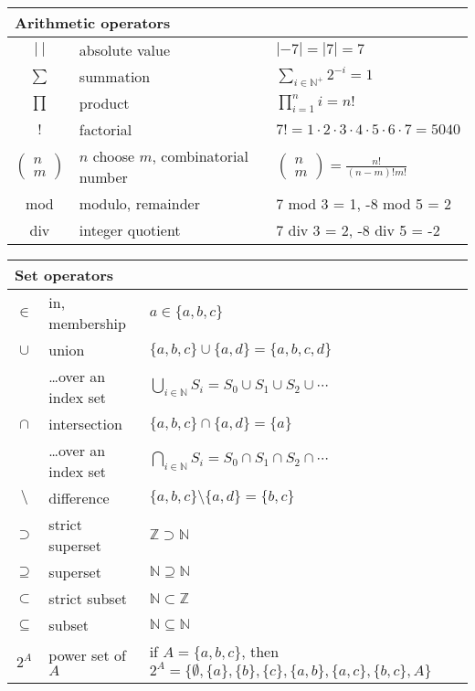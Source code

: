 \documentclass[11pt]{article}
\newcommand{\Naturals}{\mathbb{N}}   %
\newcommand{\Integers}{\mathbb{Z}}   %
\begin{document}
\begin{tabular}{|cll|}
\multicolumn{3}{l}{\bf Arithmetic operators}
\\ \hline
$|~|$ & absolute value & $| -7 | = |7| = 7$
\\ \hline
$\sum$ & summation& $\sum_{i \in \Naturals^+} 2^{-i} = 1$
\\ \hline
$\prod$ & product & $\prod_{i=1}^n i = n!$
\\ \hline
$!$ & factorial & $7! = 1\cdot 2\cdot 3\cdot 4\cdot 5\cdot 6\cdot 7 = 5040$
\\ \hline
$\left( \begin{array}{c} n\\m\end{array} \right )$ &
   $n$ choose $m$, combinatorial number &  $\left( \begin{array}{c}
    n\\m\end{array} \right ) = \displaystyle \frac{n!}{(n-m)! m!}$
\\ \hline
mod & modulo, remainder & 7 mod 3 = 1, -8 mod 5 = 2
\\ \hline
div & integer quotient & 7 div 3 = 2, -8 div 5 = -2
\\ \hline
\end{tabular}

\begin{tabular}{|cll|}
\multicolumn{3}{l}{\bf Set operators}
\\ \hline
$\in$ & in, membership & $a \in \{a,b,c\}$
\\ \hline
$\cup$ & union & $\{a,b,c\} \cup \{a,d\} = \{a,b,c,d\}$
\\ \hline
       & \ldots over an index set & $\bigcup_{i\in \Naturals}
                S_i = S_0 \cup S_1 \cup S_2 \cup \cdots$
\\ \hline
$\cap$ & intersection & $\{a,b,c\} \cap \{a,d\} = \{a\}$
\\ \hline
       & \ldots over an index set & $\bigcap_{i\in \Naturals}
                S_i = S_0 \cap S_1 \cap S_2 \cap \cdots$
\\ \hline
$\setminus$ & difference & $\{a,b,c\} \setminus \{a,d\} = \{b,c\}$
\\ \hline
$\supset$ & strict superset & $\Integers \supset \Naturals$
\\ \hline
$\supseteq$ & superset & $\Naturals \supseteq \Naturals$
\\ \hline
$\subset$ & strict subset & $\Naturals \subset \Integers$
\\ \hline
$\subseteq$ & subset & $\Naturals \subseteq \Naturals$
\\ \hline
$2^A$ & power set of $A$ & if $A = \{a,b,c\}$, then $2^A = \{ \emptyset,
   \{a\}, \{b\}, \{c\}, \{a,b\}, \{a,c\}, \{b,c\}, A \}$
\\ \hline
\end{tabular}
\end{document}
